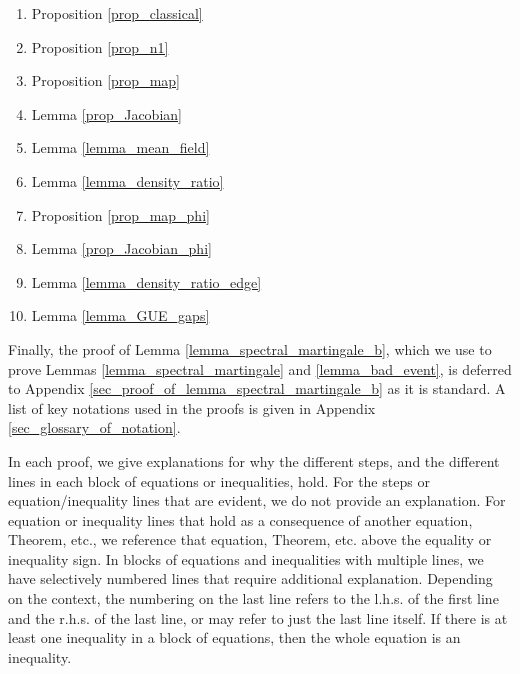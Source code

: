 \documentclass[11pt,letterpaper]{article}
\begin{document}
\begin{enumerate}
\item[(13)] Proposition \ref{prop_classical}
\item[(14)] Proposition \ref{prop_n1}
\item[(15)] Proposition \ref{prop_map}
\item[(16)] Lemma \ref{prop_Jacobian}
\item[(17)] Lemma \ref{lemma_mean_field}
\item[(18)] Lemma \ref{lemma_density_ratio}
\item[(19)] Proposition \ref{prop_map_phi}
\item[(20)] Lemma \ref{prop_Jacobian_phi}
\item[(21)] Lemma \ref{lemma_density_ratio_edge}
\item[(22)] Lemma \ref{lemma_GUE_gaps}
\end{enumerate}
%
\noindent
Finally, the proof of Lemma \ref{lemma_spectral_martingale_b}, which we use to prove Lemmas \ref{lemma_spectral_martingale} and \ref{lemma_bad_event}, is deferred to Appendix \ref{sec_proof_of_lemma_spectral_martingale_b} as it is standard.
%
 A list of key notations used in the proofs is given in Appendix \ref{sec_glossary_of_notation}. 


 In each proof, we give explanations for why the different steps, and the different lines in each block of equations or inequalities, hold.
%
 For the steps or equation/inequality lines that are evident, we do not provide an explanation.
%
  For equation or inequality lines that hold as a consequence of another equation, Theorem, etc., we reference that equation, Theorem, etc. above the equality or inequality sign.
%
 In blocks of equations and inequalities with multiple lines, we have selectively numbered lines that require additional explanation. 
%
 Depending on the context, the numbering on the last line refers to the l.h.s. of the first line and the r.h.s. of the last line, or may refer to just the last line itself.
%
 If there is at least one inequality in a block of equations, then the whole equation is an inequality.


\begin{figure}[omitted: a diagram of this paper's results, not reproduced here]\label{fig_proof_diagram_1}\end{figure}

 
\begin{figure}[omitted: a diagram of this paper's results, not reproduced here]\label{fig_proof_diagram_2}\end{figure}
\end{document}
